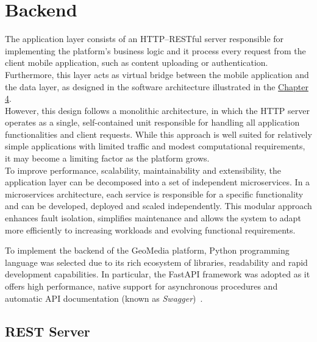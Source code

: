 \chapter{Backend}
\label{cap:backend}

The application layer consists of an HTTP--RESTful server responsible for implementing the platform's business logic and it process every request from the client mobile application, such as content uploading or authentication. Furthermore, this layer acts as virtual bridge between the mobile application and the data layer, as designed in the software architecture illustrated in the {\hyperref[cap:architecture]{Chapter 4}}.\\
However, this design follows a monolithic architecture, in which the HTTP server operates as a single, self-contained unit responsible for handling all application functionalities and client requests. While this approach is well suited for relatively simple applications with limited traffic and modest computational requirements, it may become a limiting factor as the platform grows. \\
To improve performance, scalability, maintainability and extensibility, the application layer can be decomposed into a set of independent microservices. In a microservices architecture, each service is responsible for a specific functionality and can be developed, deployed and scaled independently. This modular approach enhances fault isolation, simplifies maintenance and allows the system to adapt more efficiently to increasing workloads and evolving functional requirements.

To implement the backend of the GeoMedia platform, Python programming language was selected due to its rich ecosystem of libraries, readability and rapid development capabilities. In particular, the FastAPI framework was adopted as it offers high performance, native support for asynchronous procedures and automatic API documentation (known as \textit{Swagger})~\cite{site:swagger}. 

\section{REST Server}
\label{sec:rest_server}

